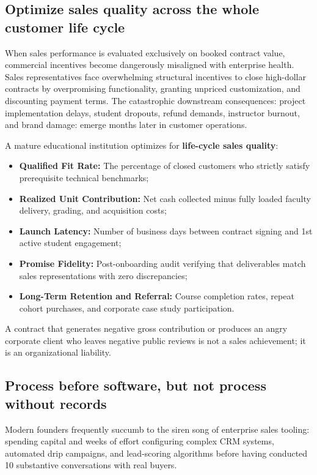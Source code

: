\subsection{Optimize sales quality across the whole customer life cycle}

When sales performance is evaluated exclusively on booked contract value, commercial incentives become dangerously misaligned with enterprise health. Sales representatives face overwhelming structural incentives to close high-dollar contracts by overpromising functionality, granting unpriced customization, and discounting payment terms. The catastrophic downstream consequences: project implementation delays, student dropouts, refund demands, instructor burnout, and brand damage: emerge months later in customer operations.

A mature educational institution optimizes for \textbf{life-cycle sales quality}:
\begin{itemize}
\item \textbf{Qualified Fit Rate:} The percentage of closed customers who strictly satisfy prerequisite technical benchmarks;
\item \textbf{Realized Unit Contribution:} Net cash collected minus fully loaded faculty delivery, grading, and acquisition costs;
\item \textbf{Launch Latency:} Number of business days between contract signing and 1st active student engagement;
\item \textbf{Promise Fidelity:} Post-onboarding audit verifying that deliverables match sales representations with zero discrepancies;
\item \textbf{Long-Term Retention and Referral:} Course completion rates, repeat cohort purchases, and corporate case study participation.
\end{itemize}
A contract that generates negative gross contribution or produces an angry corporate client who leaves negative public reviews is not a sales achievement; it is an organizational liability.

\subsection{Process before software, but not process without records}

Modern founders frequently succumb to the siren song of enterprise sales tooling: spending capital and weeks of effort configuring complex CRM systems, automated drip campaigns, and lead-scoring algorithms before having conducted 10 substantive conversations with real buyers.

